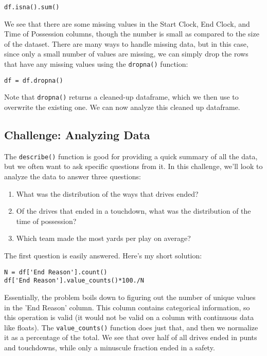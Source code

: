 \documentclass[12pt]{article}
\newcommand{\code}{\texttt}
\begin{document}
\begin{lstlisting}[frame=single] 
df.isna().sum()
\end{lstlisting}

We see that there are some missing values in the Start Clock, End Clock, and Time of Possession columns, though the number is small as compared to the size of the dataset. There are many ways to handle missing data, but in this case, since only a small number of values are missing, we can simply drop the rows that have any missing values using the \code{dropna()} function:

\begin{lstlisting}[frame=single] 
df = df.dropna()
\end{lstlisting}

Note that \code{dropna()} returns a cleaned-up dataframe, which we then use to overwrite the existing one. We can now analyze this cleaned up dataframe.


\subsection{Challenge: Analyzing Data}
The \code{describe()} function is good for providing a quick summary of all the data, but we often want to ask specific questions from it. In this challenge, we'll look to analyze the data to answer three questions:

\begin{enumerate} 
	\item What was the distribution of the ways that drives ended? 
	\item Of the drives that ended in a touchdown, what was the distribution of the time of possession?
	\item Which team made the most yards per play on average?
\end{enumerate}

The first question is easily answered. Here's my short solution:

\begin{lstlisting}[frame=single] 
N = df['End Reason'].count()
df['End Reason'].value_counts()*100./N
\end{lstlisting}

Essentially, the problem boils down to figuring out the number of unique values in the 'End Reason' column. This column contains categorical information, so this operation is valid (it would not be valid on a column with continuous data like floats). The \code{value\_counts()} function does just that, and then we normalize it as a percentage of the total. We see that over half of all drives ended in punts and touchdowns, while only a minuscule fraction ended in a safety.
\end{document}

